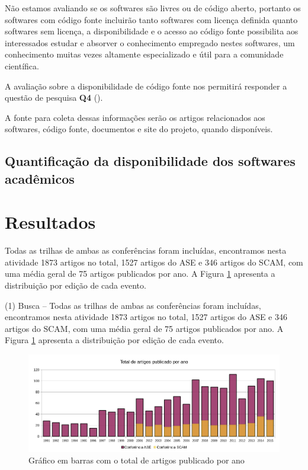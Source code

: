 Não estamos avaliando se os softwares são livres ou de código aberto, portanto
os softwares com código fonte incluirão tanto softwares com licença definida
quanto softwares sem licença, a disponibilidade e o acesso ao código fonte
possibilita aos interessados estudar e absorver o conhecimento empregado nestes
softwares, um conhecimento muitas vezes altamente especializado e útil para a
comunidade científica.

A avaliação sobre a disponibilidade de código fonte nos permitirá responder a questão de pesquisa
{\bf Q4} (\QuestaoQuatro).

A fonte para coleta dessas informações serão os artigos relacionados aos
softwares, código fonte, documentos e site do projeto, quando disponíveis.

\subsection{Quantificação da disponibilidade dos softwares acadêmicos}

\section{Resultados}

Todas as trilhas de ambas as conferências
foram incluídas, encontramos nesta atividade 1873 artigos no total, 1527 artigos
do ASE e 346 artigos do SCAM, com uma média geral de 75 artigos publicados por ano. A
Figura \ref{artigos-por-ano} apresenta a distribuição por edição de cada
evento.

(1) Busca -- Todas as trilhas de ambas as conferências foram incluídas,
encontramos nesta atividade 1873 artigos no total, 1527 artigos do ASE e 346
artigos do SCAM, com uma média geral de 75 artigos publicados por ano. A Figura
\ref{artigos-por-ano} apresenta a distribuição por edição de cada evento.

\begin{figure}[h]
  \center
  \includegraphics[scale=0.65]{imagens/artigos-por-ano.png}
  \caption{Gráfico em barras com o total de artigos publicado por ano}
  \label{artigos-por-ano}
\end{figure}

